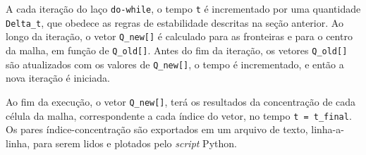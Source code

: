 A cada iteração do laço \verb|do-while|, o tempo \verb|t| é incrementado por
uma quantidade \verb|Delta_t|, que obedece as regras de estabilidade descritas
na seção anterior. Ao longo da iteração, o vetor \verb|Q_new[]| é calculado
para as fronteiras e para o centro da malha, em função de \verb|Q_old[]|. Antes
do fim da iteração, os vetores \verb|Q_old[]| são atualizados com os valores de
\verb|Q_new[]|, o tempo é incrementado, e então a nova iteração é iniciada.

Ao fim da execução, o vetor \verb|Q_new[]|, terá os resultados da concentração
de cada célula da malha, correspondente a cada índice do vetor, no tempo
\verb|t = t_final|. Os pares índice-concentração são exportados em um arquivo
de texto, linha-a-linha, para serem lidos e plotados pelo \textit{script}
Python.
